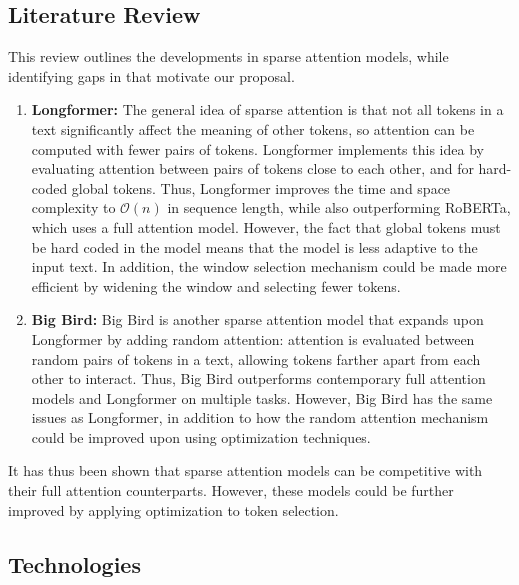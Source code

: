 \documentclass{article}
\begin{document}
\subsection{Literature Review} %
This review outlines the developments in sparse attention models, while identifying gaps in that motivate our proposal.
\begin{enumerate}
    \item \textbf{Longformer:} The general idea of sparse attention is that not all tokens in a text significantly affect the meaning of other tokens, so attention can be computed with fewer pairs of tokens. Longformer implements this idea by evaluating attention between pairs of tokens close to each other, and for hard-coded global tokens. Thus, Longformer improves the time and space complexity to \(\mathcal{O}(n)\) in sequence length, while also outperforming RoBERTa, which uses a full attention model. However, the fact that global tokens must be hard coded in the model means that the model is less adaptive to the input text. In addition, the window selection mechanism could be made more efficient by widening the window and selecting fewer tokens. \cite{longformer}
    \item \textbf{Big Bird:} Big Bird is another sparse attention model that expands upon Longformer by adding random attention: attention is evaluated between random pairs of tokens in a text, allowing tokens farther apart from each other to interact. Thus, Big Bird outperforms contemporary full attention models and Longformer on multiple tasks. However, Big Bird has the same issues as Longformer, in addition to how the random attention mechanism could be improved upon using optimization techniques. \cite{bigbird}

\end{enumerate}
It has thus been shown that sparse attention models can be competitive with their full attention counterparts. However, these models could be further improved by applying optimization to token selection.

\subsection{Technologies} %
\end{document}
